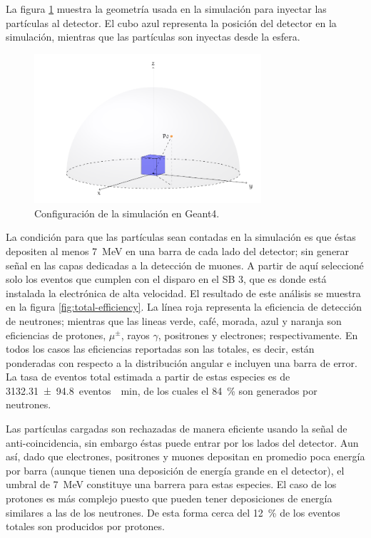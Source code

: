 La figura \ref{fig:sim-setup} muestra la geometría usada en la simulación para inyectar las partículas al detector. El cubo azul representa la posición del detector en la simulación, mientras que las partículas son inyectas desde la esfera.

\begin{figure}
        \centering
        \includegraphics[width=0.75\textwidth]{sim-setup.pdf}
        \caption{Configuración de la simulación en Geant4.}
        \label{fig:sim-setup}
\end{figure}

La condición para que las partículas sean contadas en la simulación es que éstas depositen al menos \SI{7}{\mega\electronvolt} en una barra de cada lado del detector; sin generar señal en las capas dedicadas a la detección de muones. A partir de aquí seleccioné solo los eventos que cumplen con el disparo en el SB \num{3}, que es donde está instalada la electrónica de alta velocidad. El resultado de este análisis se muestra en la figura \ref{fig:total-efficiency}. La línea roja representa la eficiencia de detección de neutrones; mientras que las lineas verde, café, morada, azul y naranja son eficiencias de protones, $\mu^{\pm}$, rayos $\gamma$, positrones y electrones; respectivamente. En todos los casos las eficiencias reportadas son las totales, es decir, están ponderadas con respecto a la distribución angular e incluyen una barra de error. La tasa de eventos total estimada a partir de estas especies es de \SI{3132.31(9480)}{eventos \per\minute}, de los cuales el \SI{84}{\percent} son generados por neutrones.

Las partículas cargadas son rechazadas de manera eficiente usando la señal de anti-coincidencia, sin embargo éstas puede entrar por los lados del detector. Aun así, dado que electrones, positrones y muones depositan en promedio poca energía por barra (aunque tienen una deposición de energía grande en el detector), el umbral de \SI{7}{\mega\electronvolt} constituye una barrera para estas especies. El caso de los protones es más complejo
puesto que pueden tener deposiciones de energía similares a las de los neutrones. De esta forma cerca del \SI{12}{\percent} de los eventos totales son producidos por protones.

